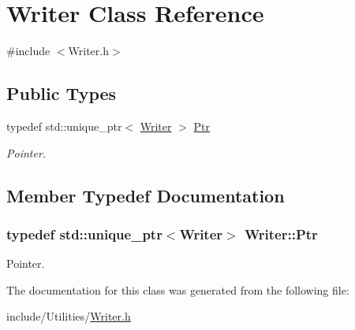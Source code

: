 \hypertarget{class_writer}{\section{Writer Class Reference}
\label{class_writer}
}


{\ttfamily \#include $<$Writer.\-h$>$}

\subsection*{Public Types}
\begin{DoxyCompactItemize}
\item 
typedef std\-::unique\-\_\-ptr$<$ \hyperlink{class_writer}{Writer} $>$ \hyperlink{class_writer_a969188b5d6bad75395bdd8a7fe4a6907}{Ptr}
\begin{DoxyCompactList}\small\item\em Pointer. \end{DoxyCompactList}\end{DoxyCompactItemize}


\subsection{Member Typedef Documentation}
\hypertarget{class_writer_a969188b5d6bad75395bdd8a7fe4a6907}{
\subsubsection[{Ptr}]{\setlength{\rightskip}{0pt plus 5cm}typedef std\-::unique\-\_\-ptr$<${\bf Writer}$>$ {\bf Writer\-::\-Ptr}}}\label{class_writer_a969188b5d6bad75395bdd8a7fe4a6907}


Pointer. 



The documentation for this class was generated from the following file\-:\begin{DoxyCompactItemize}
\item 
include/\-Utilities/\hyperlink{_writer_8h}{Writer.\-h}\end{DoxyCompactItemize}

